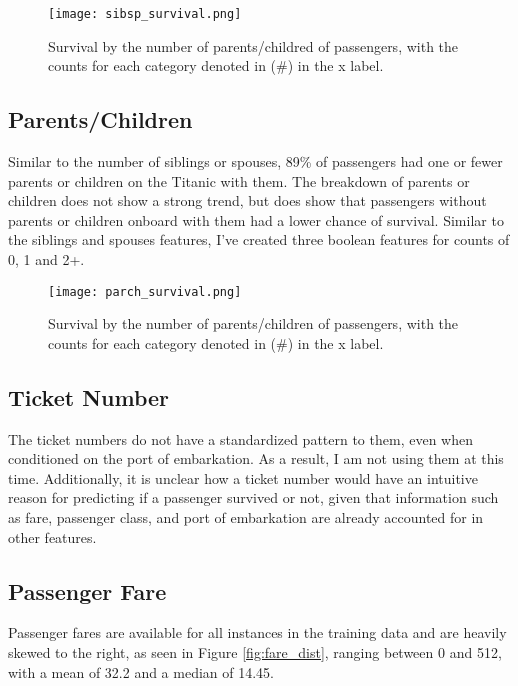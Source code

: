 \documentclass[12pt, letterpaper]{article}
\begin{document}
\begin{figure}[H]
    \centering
    \texttt{[image: sibsp\_survival.png]}
    \caption{Survival by the number of parents/childred of passengers, with the counts for each category denoted in (\#) in the x label. }
    \label{fig:sibsp_prob}
\end{figure}


\subsection{Parents/Children}

Similar to the number of siblings or spouses, 89\% of passengers had one or fewer parents or children on the Titanic with them. The breakdown of parents or children does not show a strong trend, but does show that passengers without parents or children onboard with them had a lower chance of survival. Similar to the siblings and spouses features, I've created three boolean features for counts of 0, 1 and 2+. 

\begin{figure}[H]
    \centering
    \texttt{[image: parch\_survival.png]}
    \caption{Survival by the number of parents/children of passengers, with the counts for each category denoted in (\#) in the x label. }
    \label{fig:parch_prob}
\end{figure}


\subsection{Ticket Number}

The ticket numbers do not have a standardized pattern to them, even when conditioned on the port of embarkation. As a result, I am not using them at this time. Additionally, it is unclear how a ticket number would have an intuitive reason for predicting if a passenger survived or not, given that information such as fare, passenger class, and port of embarkation are already accounted for in other features. 

\subsection{Passenger Fare}

Passenger fares are available for all instances in the training data and are heavily skewed to the right, as seen in Figure  \ref{fig:fare_dist}, ranging between 0 and 512, with a mean of 32.2 and a median of 14.45.  
\end{document}
